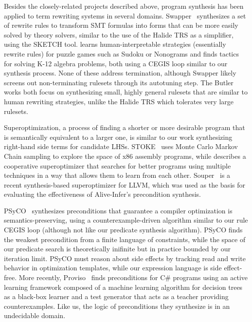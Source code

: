 \documentclass[acmsmall,review,anonymous]{acmart}\settopmatter{printfolios=true,printccs=false,printacmref=false}
\begin{document}
Besides the closely-related projects described above, program synthesis has been applied to term rewriting systems in several domains. Swapper~\cite{singh2016swapper} synthesizes a set of rewrite rules to transform SMT formulas into forms that can be more easily solved by theory solvers, similar to the use of the Halide TRS as a simplifier, using the SKETCH tool. \citet{butler2017synthesizing} learns human-interpretable strategies (essentially rewrite rules) for puzzle games such as Sudoku or Nonograms and \citet{butler2018framework} finds tactics for solving K-12 algebra problems, both using a CEGIS loop similar to our synthesis process. None of these address termination, although Swapper likely screens out non-terminating rulesets through its autotuning step. The Butler works both focus on synthesizing small, highly general rulesets that are similar to human rewriting strategies, unlike the Halide TRS which tolerates very large rulesets.

Superoptimization, a process of finding a shorter or more desirable program that is semantically equivalent to a larger one, is similar to our work synthesizing right-hand side terms for candidate LHSs. STOKE~\cite{schkufza2013stochastic} uses Monte Carlo Markov Chain sampling to explore the space of x86 assembly programs, while \citet{phothilimthana2016scaling} describes a cooperative superoptimizer that searches for better programs using multiple techniques in a way that allows them to learn from each other.  Souper~\cite{sasnauskas2017souper} is a recent synthesis-based superoptimizer for LLVM, which was used as the basis for evaluating the effectiveness of Alive-Infer's precondition synthesis.

PSyCO~\cite{lopes2014weakest} synthesizes preconditions that guarantee a compiler optimization is semantics-preserving, using a counterexample-driven algorithm similar to our rule CEGIS loop (although not like our predicate synthesis algorithm). PSyCO finds the weakest precondition from a finite language of constraints, while the space of our predicate search is theoretically inifinite but in practice bounded by our iteration limit. PSyCO must reason about side effects by tracking read and write behavior in optimization templates, while our expression language is side effect-free. More recently, Proviso~\cite{astorga2019learning} finds preconditions for C\# programs using an active learning framework composed of a machine learning algorithm for decision trees as a black-box learner and a test generator that acts as a teacher providing counterexamples. Like us, the logic of preconditions they synthesize is in an undecidable domain.
\end{document}
